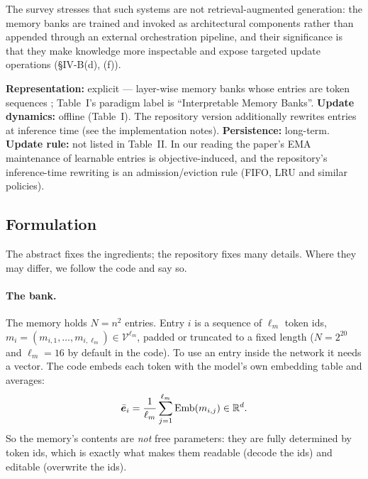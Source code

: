 The survey stresses that such systems are not retrieval-augmented generation: the memory banks are
trained and invoked as architectural components rather than appended through an external
orchestration pipeline, and their significance is that they make knowledge more inspectable and
expose targeted update operations (\S IV-B(d), (f)).

\begin{taxonomy}
\textbf{Representation:} explicit --- layer-wise memory banks whose entries are token sequences
\citep[\S IV-B(d)]{zhoubian2026memory}; Table~I's paradigm label is ``Interpretable Memory Banks''.
\textbf{Update dynamics:} offline (Table~I). The repository version additionally rewrites entries at
inference time (see the implementation notes).
\textbf{Persistence:} long-term.
\textbf{Update rule:} not listed in Table~II. In our reading the paper's EMA maintenance of
learnable entries is objective-induced, and the repository's inference-time rewriting is an
admission/eviction rule (FIFO, LRU and similar policies).
\end{taxonomy}

\subsection{Formulation}

The abstract fixes the ingredients; the repository fixes many details. Where they may differ, we
follow the code and say so.

\paragraph{The bank.} The memory holds $N = n^2$ entries. Entry $i$ is a sequence of $\ell_m$ token
ids, $m_i = (m_{i,1},\dots,m_{i,\ell_m}) \in \mathcal{V}^{\ell_m}$, padded or truncated to a fixed
length ($N = 2^{20}$ and $\ell_m = 16$ by default in the code). To use an entry inside the network
it needs a vector. The code embeds each token with the model's own embedding table and averages:
\begin{equation}
  \bar{\bm{e}}_i = \frac{1}{\ell_m}\sum_{j=1}^{\ell_m} \mathrm{Emb}(m_{i,j}) \in \mathbb{R}^{d} .
  \label{eq:c10-entry}
\end{equation}
So the memory's contents are \emph{not} free parameters: they are fully determined by token ids,
which is exactly what makes them readable (decode the ids) and editable (overwrite the ids).

